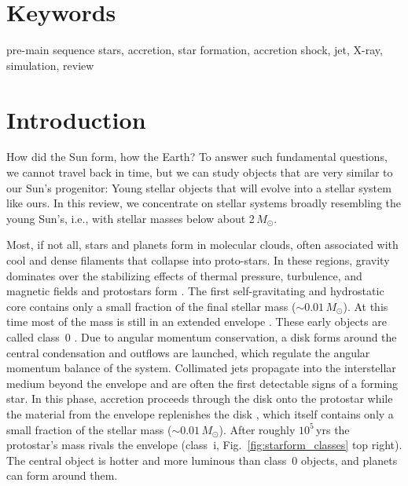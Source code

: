 \documentclass[graybox, nosecnum]{svmult}
\begin{document}
\section{Keywords}
pre-main sequence stars, accretion, star formation, accretion shock, jet, X-ray, simulation, review

\section{Introduction}
\setcounter{footnote}{0}
How did the Sun form, how the Earth? To answer such fundamental questions, we cannot travel back in time, but we can study objects that are very similar to our Sun's progenitor: Young stellar objects that will evolve into a stellar system like ours. In this review, we concentrate on stellar systems broadly resembling the young Sun's, i.e., with stellar masses below about 2$\,M_\odot$.

Most, if not all, stars and planets form in molecular clouds, often associated with cool and dense filaments that collapse into proto-stars. In these regions, gravity dominates over the stabilizing effects of thermal pressure, turbulence, and magnetic fields \citep[e.g., ][]{McKee_2007} and protostars form  \citep{Andre_2014}. The first self-gravitating and hydrostatic core contains only a small fraction of the final stellar mass ($\sim0.01\,M_\odot$). At this time most of the mass is still in an extended envelope \citep[e.g.,][]{Gong_2015,Lee_2020}. These early objects are called class~0 \citep[see Fig.~\ref{fig:starform_classes} top left, and ][]{Andre_1993, Larson_2003}. Due to angular momentum conservation, a disk forms around the central condensation and outflows are launched, which regulate the angular momentum balance of the system. Collimated jets propagate into the interstellar medium beyond the envelope and are often the first detectable signs of a forming star. In this phase, accretion proceeds through the disk onto the protostar while the material from the envelope replenishes the disk \citep{Padoan_2014}, which itself contains only a small fraction of the stellar mass ($\sim0.01\,M_\odot$). After roughly $10^5$\,yrs the protostar's mass rivals the envelope (class~{\sc i}, Fig.~\ref{fig:starform_classes} top right). The central object is hotter and more luminous than class~0 objects, and planets can form around them.
\end{document}
